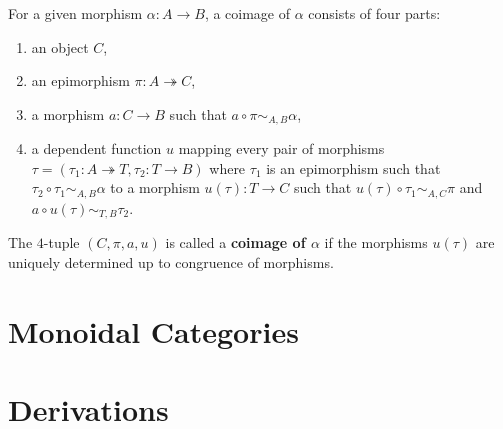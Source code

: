 \begin{definition}
 For a given morphism $\alpha: A \rightarrow B$, a coimage of $\alpha$ consists of four parts:
 \begin{enumerate}
  \item an object $C$,
  \item an epimorphism $\pi: A \twoheadrightarrow C$,
  \item a morphism $a: C \rightarrow B$ such that $a \circ \pi \sim_{A,B} \alpha$,
  \item a dependent function $u$ mapping every pair of morphisms $\tau = ( \tau_1: A \twoheadrightarrow T, \tau_2: T \rightarrow B )$
  where $\tau_1$ is an epimorphism
  such that $\tau_2 \circ \tau_1 \sim_{A,B} \alpha$ to a morphism
  $u(\tau): T \rightarrow C$ such that
  $u( \tau ) \circ \tau_1 \sim_{A,C} \pi$ and $a \circ u( \tau ) \sim_{T,B} \tau_2$.
 \end{enumerate}
  The $4$-tuple $( C, \pi, a, u )$ is called a \textbf{coimage of $\alpha$} if the morphisms $u( \tau )$ are uniquely determined up to
 congruence of morphisms.
\end{definition}



\section{Monoidal Categories}

\section{Derivations}\label{section:derivations}